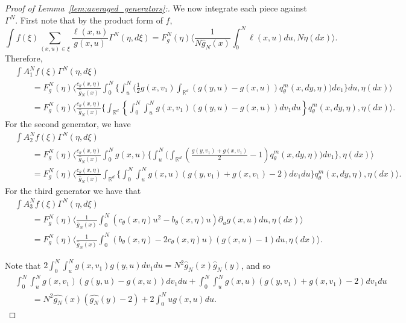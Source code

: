 \documentclass[EJP]{ejpecp} %
\renewcommand{\hat}{\widehat}
\newcommand{\IR}{\mathbb R}
\newcommand{\lp}{\xi}              %
\begin{document}
\begin{proof}[Proof of Lemma~\ref{lem:averaged_generators}:]
We now integrate each piece against $\Gamma^N$.
First note that by the product form of $f$,
$$
    \int f(\lp) \sum_{(x,u)\in\lp} \frac{\ell(x,u)}{g(x,u)} \Gamma^N(\eta,d\lp)
    =
    F_g^N(\eta) \bigg\langle
        \frac{1}{N \hat g_N(x)} \int_0^N \ell(x,u) du,
        N \eta(dx)
    \bigg\rangle .
$$
Therefore,
\footnotesize
\begin{align*}
&
    \int A^N_1f(\lp) \Gamma^N(\eta,d\lp) 
\\ &\qquad =
    F_g^N(\eta) \bigg\langle \frac{c_\theta(x,\eta)}{\hat g_N(x)} \int_0^N \Bigg\{
        \int_u^N \Bigg(
            \frac{1}{2} g(x,v_1) \int_{\IR^d}(g(y,u)-g(x,u))q^m_{\theta}(x,dy,\eta)
        \Bigg) dv_1
    \Bigg\} du, \eta(dx) \bigg \rangle
\\ &\qquad =
    F_g^N(\eta) \bigg\langle \frac{c_\theta(x,\eta)}{\hat g_N(x)} \Bigg\{
    \int_{\IR^d} \left\{
        \int_{0}^{N} \int_u^N g(x,v_1) (g(y,u)-g(x,u)) dv_1 du
    \right\} q^m_{\theta}(x,dy,\eta)
    , \eta(dx) \bigg \rangle .
\end{align*}
\normalsize
For the second generator, we have
\footnotesize
\begin{align*}
&
    \int A^N_2 f(\lp) \Gamma^N(\eta, d\lp)
\\ &\qquad =
    F_g^N(\eta) \bigg\langle \frac{c_\theta(x,\eta)}{\hat g_N(x)} \int_0^N g(x, u) \Bigg\{
        \int_u^N\Bigg(\int_{\IR^d}
        \left(\frac{g(y,v_1)+g(x,v_1)}{2}-1\right) q^m_{\theta}(x,dy,\eta)
        \Bigg)dv_1 \Bigg\}
    , \eta(dx) \bigg\rangle
\\ &\qquad =
    F_g^N(\eta) \bigg\langle \frac{c_\theta(x,\eta)}{\hat g_N(x)}
    \int_{\IR^d}\Bigg\{ \int_{0}^{N}
    \int_u^N g(x,u) \left(
        g(y,v_1)+g(x,v_1)-2
    \right) dv_1 du\Bigg\} q^m_{\theta}(x,dy,\eta)
    , \eta(dx) \bigg\rangle .
\end{align*}  
\normalsize
For the third generator we have that
\begin{align*}
&
    \int A^N_3f(\xi)\Gamma^N(\eta,d\lp)
\\ & \qquad =
    F_g^N(\eta) \bigg\langle \frac{1}{\hat g_N(x)}
    \int_0^N
        \left( c_\theta(x,\eta) u^2 - b_\theta(x,\eta) u \right) \partial_u g(x,u)
    du
    , \eta(dx) \bigg\rangle 
\\ & \qquad =
    F_g^N(\eta) \bigg\langle \frac{1}{\hat g_N(x)}
    \int_0^N
        \left( b_\theta(x,\eta) - 2 c_\theta(x,\eta) u \right) (g(x,u) - 1)
    du
    , \eta(dx) \bigg\rangle .
\end{align*}

Note that $2 \int_0^N \int_u^N g(x,v_1) g(y,u) dv_1 du = N^2 \hat g_N(x) \hat g_N(y)$,
and so
\begin{align*}
&
    \int_{0}^{N} \int_u^N g(x,v_1) (g(y,u)-g(x,u)) dv_1 du
    + \int_{0}^{N} \int_u^N g(x,u) \left(g(y,v_1)+g(x,v_1)-2\right)dv_1 du
\\ &\qquad = 
    N^2 \hat{g_N}(x)(\hat{g_N}(y) - 2) + 2\int_{0}^{N} u g(x,u) du.
\end{align*}


\end{proof}
\end{document}
